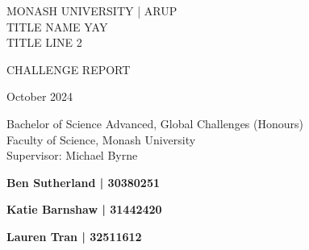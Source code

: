 \begin{titlingpage}
    \textheight
    \vspace*{\drop}
    \centering
    {\LARGE MONASH UNIVERSITY | ARUP}\\[2\baselineskip]
    {
    \LARGE\sffamily 
    TITLE NAME YAY\\TITLE LINE 2
    }\par
    \vfill
    {\LARGE CHALLENGE REPORT}\par
    \vspace{\drop}
    {
        \Large October 2024 \\
        \par
        \large Bachelor of Science Advanced, Global Challenges (Honours) \\
        \large Faculty of Science, Monash University \\
        \large Supervisor: Michael Byrne \\
    }\par
    \vfill
    {\large\bfseries Ben Sutherland | 30380251}\par
    {\large\bfseries Katie Barnshaw | 31442420}\par
    {\large\bfseries Lauren Tran | 32511612}\par
    \vspace*{\drop}
\end{titlingpage}
